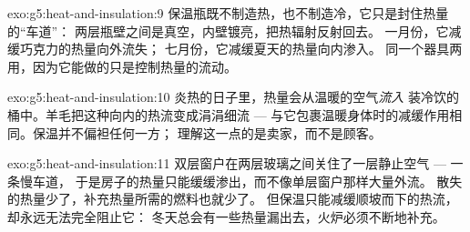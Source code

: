 \begin{solution}{exo:g5:heat-and-insulation:9}
保温瓶既不制造热，也不制造冷，它只是封住热量的“车道”：
两层瓶壁之间是真空，内壁镀亮，把热辐射反射回去。
一月份，它减缓巧克力的热量向外流失；
七月份，它减缓夏天的热量向内渗入。
同一个器具两用，因为它能做的只是控制热量的流动。
\end{solution}

\begin{solution}{exo:g5:heat-and-insulation:10}
炎热的日子里，热量会从温暖的空气\emph{流入}
装冷饮的桶中。羊毛把这种向内的热流变成涓涓细流 ---
与它包裹温暖身体时的减缓作用相同。保温并不偏袒任何一方；
理解这一点的是卖家，而不是顾客。
\end{solution}

\begin{solution}{exo:g5:heat-and-insulation:11}
双层窗户在两层玻璃之间关住了一层静止空气 ---
一条慢车道，
于是房子的热量只能缓缓渗出，而不像单层窗户那样大量外流。
散失的热量少了，补充热量所需的燃料也就少了。
但保温只能减缓顺坡而下的热流，却永远无法完全阻止它：
冬天总会有一些热量漏出去，火炉必须不断地补充。
\end{solution}
